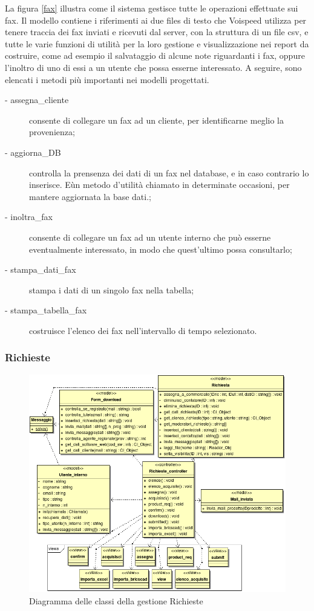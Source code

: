 \noindent
La figura \ref{fax} illustra come il sistema gestisce tutte le operazioni effettuate sui fax. Il modello contiene i riferimenti ai due files di testo che Voispeed utilizza per tenere traccia dei fax inviati e ricevuti dal server, con la struttura di un file csv, e tutte le varie funzioni di utilit\`a per la loro gestione e visualizzazione nei report da costruire, come ad esempio il salvataggio di alcune note riguardanti i fax, oppure l'inoltro di uno di essi a un utente che possa esserne interessato.
A seguire, sono elencati i metodi pi\`u importanti nei modelli progettati.
\begin{description}
\item[- assegna\_cliente] consente di collegare un fax ad un cliente, per identificarne meglio la provenienza;
\item[- aggiorna\_DB] controlla la prensenza dei dati di un fax nel database, e in caso contrario lo inserisce. E\` un metodo d'utilit\`a chiamato in determinate occasioni, per mantere aggiornata la base dati.;
\item[- inoltra\_fax] consente di collegare un fax ad un utente interno che pu\`o esserne eventualmente interessato, in modo che quest'ultimo possa consultarlo;
\item[- stampa\_dati\_fax] stampa i dati di un singolo fax nella tabella;
\item[- stampa\_tabella\_fax] costruisce l'elenco dei fax nell'intervallo di tempo selezionato.
\end{description}

\newpage
\subsubsection{Richieste}
\begin{figure}[!ht]
\centering
  \includegraphics[scale=0.8]{./images/richiesteMVC.png}
\caption{Diagramma delle classi della gestione Richieste}
\label{richieste}
\end{figure}

